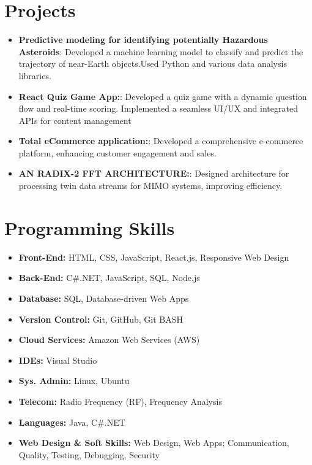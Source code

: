 \documentclass[letterpaper,11pt]{article}
\newcommand{\resumeItem}[2]{
  \item\small{
    \textbf{#1}{: #2 \vspace{-2pt}}
  }
}
\newcommand{\resumeSubItem}[2]{\resumeItem{#1}{#2}\vspace{-4pt}}
\newcommand{\resumeSubHeadingListStart}{\begin{itemize}[leftmargin=*]}
\newcommand{\resumeSubHeadingListEnd}{\end{itemize}}
\begin{document}
\section{Projects}
  \resumeSubHeadingListStart
   \resumeSubItem{Predictive modeling for identifying potentially Hazardous Asteroids}
      {Developed a machine learning model to classify and predict the trajectory of near-Earth objects.Used Python and various data analysis libraries.}
    \resumeSubItem{React Quiz Game App:}
      {Developed a quiz game with a dynamic question flow and real-time scoring. Implemented a seamless UI/UX and integrated APIs for content management}
    \resumeSubItem{Total eCommerce application:}
      {Developed a comprehensive e-commerce platform, enhancing
customer engagement and sales.}
    \resumeSubItem{AN RADIX-2 FFT ARCHITECTURE:}
      {Designed architecture for processing twin data streams for
MIMO systems, improving efficiency.}
  \resumeSubHeadingListEnd

%
\section{Programming Skills}
\resumeSubHeadingListStart
\begin{itemize}[noitemsep]
    \item \textbf{Front-End:} HTML, CSS, JavaScript, React.js, Responsive Web Design
    \item \textbf{Back-End:} C\#.NET, JavaScript, SQL, Node.js
    \item \textbf{Database:} SQL, Database-driven Web Apps
    \item \textbf{Version Control:} Git, GitHub, Git BASH
    \item \textbf{Cloud Services:} Amazon Web Services (AWS)
    \item \textbf{IDEs:} Visual Studio
    \item \textbf{Sys. Admin:} Linux, Ubuntu
    \item \textbf{Telecom:} Radio Frequency (RF), Frequency Analysis
    \item \textbf{Languages:} Java, C\#.NET
    \item \textbf{Web Design \& Soft Skills:} Web Design, Web Apps; Communication, Quality, Testing, Debugging, Security
\end{itemize}
\resumeSubHeadingListEnd


\end{document}
